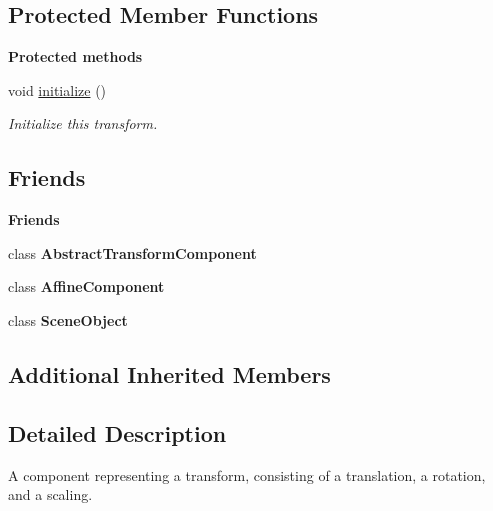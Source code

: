 \subsection*{Protected Member Functions}
\begin{Indent}\textbf{ Protected methods}\par
\begin{DoxyCompactItemize}
\item 
\mbox{\label{classrev_1_1_transform_component_adb122fbec0ec50ca341d91f7a2c9d346}} 
void \mbox{\hyperlink{classrev_1_1_transform_component_adb122fbec0ec50ca341d91f7a2c9d346}{initialize}} ()
\begin{DoxyCompactList}\small\item\em Initialize this transform. \end{DoxyCompactList}\end{DoxyCompactItemize}
\end{Indent}
\subsection*{Friends}
\begin{Indent}\textbf{ Friends}\par
\begin{DoxyCompactItemize}
\item 
\mbox{\label{classrev_1_1_transform_component_adbc81f81baaebf537a269803f0abfa66}} 
class {\bfseries Abstract\+Transform\+Component}
\item 
\mbox{\label{classrev_1_1_transform_component_a12e775e92a2c790f38385b72d54e402f}} 
class {\bfseries Affine\+Component}
\item 
\mbox{\label{classrev_1_1_transform_component_a737b3cb474f324a74e7da2d3aeca10c9}} 
class {\bfseries Scene\+Object}
\end{DoxyCompactItemize}
\end{Indent}
\subsection*{Additional Inherited Members}


\subsection{Detailed Description}
A component representing a transform, consisting of a translation, a rotation, and a scaling. 

